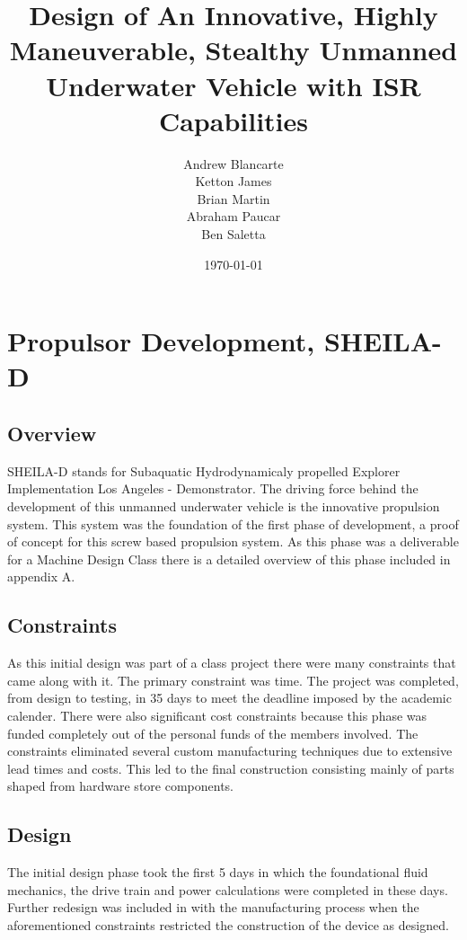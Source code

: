 \documentclass{report}
\title{Design of An Innovative, Highly Maneuverable, Stealthy Unmanned Underwater Vehicle with ISR Capabilities }
\author{Andrew Blancarte\\ Ketton James\\ Brian Martin\\ Abraham Paucar\\ Ben Saletta}
\date{\today}
\begin{document}
\maketitle
\tableofcontents
\listoffigures
\chapter{Propulsor Development, SHEILA-D}
\section{Overview}
SHEILA-D stands for Subaquatic Hydrodynamicaly propelled Explorer Implementation Los Angeles - Demonstrator. The driving force behind the development of this unmanned underwater vehicle is the innovative propulsion system. This system was the foundation of the first phase of development, a proof of concept for this screw based propulsion system. As this phase was a deliverable for a Machine Design Class there is a detailed overview of this phase included in appendix A. 
\section{Constraints}
As this initial design was part of a class project there were many constraints that came along with it. The primary constraint was time. The project was completed, from design to testing, in 35 days to meet the deadline imposed by the academic calender. There were also significant cost constraints because this phase was funded completely out of the personal funds of the members involved. The constraints eliminated several custom manufacturing techniques due to extensive lead times and costs. This led to the final construction consisting mainly of parts shaped from hardware store components.
\section{Design}
The initial design phase took the first 5 days in which the foundational fluid mechanics, the drive train and power calculations were completed in these days. Further redesign was included in with the manufacturing process when the aforementioned constraints restricted the construction of the device as designed.
\end{document}
